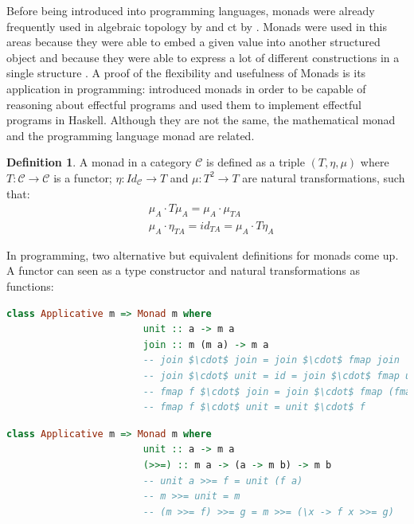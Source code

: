 \documentclass[
  oneside,
  11pt, a4paper,
  footinclude=true,
  headinclude=true,
  cleardoublepage=empty
]{scrbook}
\theoremstyle{definition}
\newtheorem{definition}{Definition}[section]
\theoremstyle{definition}
\begin{document}
	 Before being introduced into programming languages, monads were already frequently used in algebraic topology by \cite{godement1958topologie} and \gls{ct} by \cite{maclane:71}. Monads were used in this areas because they were able to embed a given value into another structured object and because they were able to express a lot of different constructions in a single structure \citep{DBLP:journals/corr/abs-1803-10195}. A proof of the flexibility and usefulness of Monads is its application in programming: \cite{Moggi:1991:NCM:116981.116984} introduced monads in order to be capable of reasoning about effectful programs and \cite{1995_wadler_monads} used them to implement effectful programs in Haskell. Although they are not the same, the mathematical monad and the programming language monad are related.
	            
	            \begin{definition}{A monad in a category $\mathscr{C}$ is defined as a triple $(T,\eta, \mu)$ where $T : \mathscr{C} \rightarrow \mathscr{C}$ is a functor; $\eta : Id_\mathscr{C} \rightarrow T$ and $\mu : T^2 \rightarrow T$ are natural transformations, such that:}
	                \begin{align*}
	                    &\mu_A \cdot T\mu_A = \mu_A \cdot \mu_{TA} \\
	                    &\mu_A \cdot \eta_{TA} = id_{TA} = \mu_A \cdot T\eta_A
	                \end{align*}{}
	            \end{definition}
	            
	            In programming, two alternative but equivalent definitions for monads come up. A functor can seen as a type constructor and natural transformations as functions:
	            
	            \begin{lstlisting}[mathescape, language=Haskell, caption={Monad laws and definition in terms of \texttt{unit} and \texttt{join}},captionpos=b]
	                class Applicative m => Monad m where
	                    unit :: a -> m a
	                    join :: m (m a) -> m a
	                    -- join $\cdot$ join = join $\cdot$ fmap join
	                    -- join $\cdot$ unit = id = join $\cdot$ fmap unit
	                    -- fmap f $\cdot$ join = join $\cdot$ fmap (fmap f)
	                    -- fmap f $\cdot$ unit = unit $\cdot$ f
	            \end{lstlisting}{}
	            
	            \begin{lstlisting}[mathescape, language=Haskell, caption={Monad laws and definition in terms of \texttt{unit} and \texttt{bind}},captionpos=b]
	                class Applicative m => Monad m where
	                    unit :: a -> m a
	                    (>>=) :: m a -> (a -> m b) -> m b
	                    -- unit a >>= f = unit (f a)
	                    -- m >>= unit = m
	                    -- (m >>= f) >>= g = m >>= (\x -> f x >>= g)
	            \end{lstlisting}{}
	            
\end{document}
